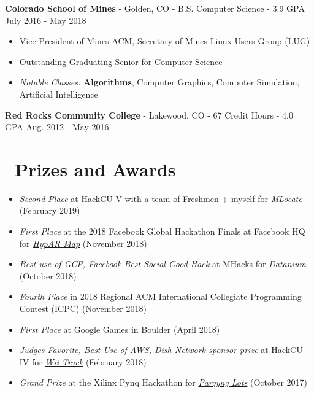 \documentclass[10pt,letterpaper]{article}
\begin{document}
\textbf{Colorado School of Mines} - Golden, CO - B.S. Computer Science - 3.9 GPA
\hfill July 2016 - May 2018
\begin{itemize}
    \item Vice President of Mines ACM, Secretary of Mines Linux Users Group
        (LUG)
    \item Outstanding Graduating Senior for Computer Science
    \item \textit{Notable Classes:} \textbf{Algorithms}, Computer Graphics,
        Computer Simulation, Artificial Intelligence
\end{itemize}

\vspace{2pt}
\textbf{Red Rocks Community College} - Lakewood, CO - 67 Credit Hours - 4.0 GPA
\hfill Aug. 2012 - May 2016

\section*{\faTrophy\ Prizes and Awards}
\begin{itemize}
    \item \textit{Second Place} at HackCU V with a team of Freshmen + myself
        for
        \href{https://sumnerevans.com/pages/portfolio.html#MLocate}{\textit{MLocate}}
        (February 2019)
    \item \textit{First Place} at the 2018 Facebook Global Hackathon Finals at
        Facebook HQ for
        \href{https://sumnerevans.com/pages/portfolio.html#HypAR-Map}{\textit{HypAR Map}}
        (November 2018)
    \item \textit{Best use of GCP, Facebook Best Social Good Hack} at MHacks for
        \href{https://sumnerevans.com/pages/portfolio.html#Datanium}{\textit{Datanium}}
        (October 2018)
    \item \textit{Fourth Place} in 2018 Regional ACM International Collegiate
        Programming Contest (ICPC) (November 2018)
    \item \textit{First Place} at Google Games in Boulder (April 2018)
    \item \textit{Judges Favorite, Best Use of AWS, Dish Network sponsor prize}
        at HackCU IV for
        \href{https://sumnerevans.com/pages/portfolio.html#Wii-Track}{\textit{Wii Track}}
        (February 2018)
    \item \textit{Grand Prize} at the Xilinx Pynq Hackathon for
        \href{https://sumnerevans.com/pages/portfolio.html#Parqyng-Lots}{\textit{Parqyng Lots}}
        (October 2017)
\end{itemize}
\end{document}
